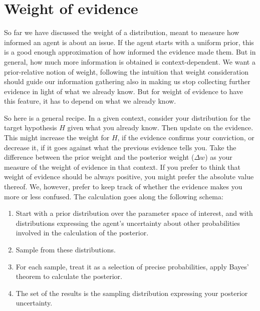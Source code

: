\documentclass[
  10pt,
  dvipsnames,enabledeprecatedfontcommands]{scrartcl}
\begin{document}

\hypertarget{weight-of-evidence}{%
\section{Weight of evidence}\label{weight-of-evidence}}

So far we have discussed the weight of a distribution, meant to measure
how informed an agent is about an issue. If the agent starts with a
uniform prior, this is a good enough approximation of how informed the
evidence made them. But in general, how much more information is
obtained is context-dependent. We want a prior-relative notion of
weight, following the intuition that weight consideration should guide
our information gathering also in making us stop collecting further
evidence in light of what we already know. But for weight of evidence to
have this feature, it has to depend on what we already know.

So here is a general recipe. In a given context, consider your
distribution for the target hypothesis \(H\) given what you already
know. Then update on the evidence. This might increase the weight for
\(H\), if the evidence confirms your conviction, or decrease it, if it
goes against what the previous evidence tells you. Take the difference
between the prior weight and the posterior weight (\(\Delta w\)) as your
measure of the weight of evidence in that context. If you prefer to
think that weight of evidence should be always positive, you might
prefer the absolute value thereof. We, however, prefer to keep track of
whether the evidence makes you more or less confused. The calculation
goes along the following schema:

\begin{enumerate}
\item Start with a prior distribution over the parameter space of interest, and with distributions expressing the agent's uncertainty about other probabilities involved in the calculation of the posterior.
\item Sample from these distributions.
\item For each sample, treat it as a selection of precise probabilities, apply Bayes' theorem to calculate the posterior.
\item The set of the results is the sampling distribution expressing your posterior uncertainty.
\end{enumerate}
\end{document}
